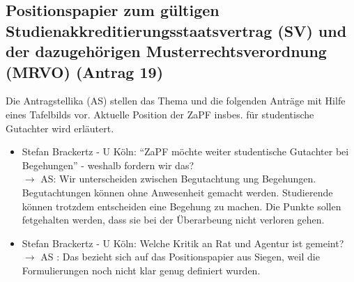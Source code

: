   \subsection*{Positionspapier zum gültigen Studienakkreditierungsstaatsvertrag (SV) und der dazugehörigen Musterrechtsverordnung (MRVO) (Antrag 19)}
    Die Antragstellika (AS) stellen das Thema und die folgenden Anträge mit Hilfe eines Tafelbilds vor.
    Aktuelle Position der ZaPF insbes. für studentische Gutachter wird erläutert.

    \begin{itemize}
      \item Stefan Brackertz - U Köln:  ``ZaPF möchte weiter studentische Gutachter bei Begehungen'' - weshalb fordern wir das? \\
        $\rightarrow$ AS: Wir unterscheiden zwischen Begutachtung ung Begehungen. Begutachtungen können ohne Anwesenheit gemacht werden. Studierende können trotzdem entscheiden eine Begehung zu machen. Die Punkte sollen fetgehalten werden, dass sie bei der Überarbeung nicht verloren gehen.

      \item Stefan Brackertz - U Köln:  Welche Kritik an Rat und Agentur ist gemeint? \\
        $\rightarrow$ AS : Das bezieht sich auf das Positionspapier aus Siegen, weil die Formulierungen noch nicht klar genug definiert wurden.


\end{itemize}
